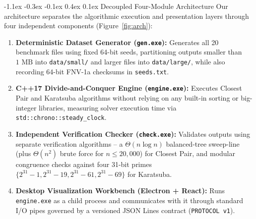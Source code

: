\documentclass[10pt,twocolumn]{article}
\makeatletter
\renewcommand\subsection{\@startsection{subsection}{2}{\z@}%
  {-1.1ex \@plus -0.3ex \@minus -0.1ex}%
  {0.4ex \@plus 0.1ex}%
  {\normalfont\small\bfseries}}
\makeatother
\begin{document}
\subsection{Decoupled Four-Module Architecture}
Our architecture separates the algorithmic execution and presentation layers through four independent components (Figure~\ref{fig:arch}):
\begin{enumerate}
    \item \textbf{Deterministic Dataset Generator (\texttt{gen.exe}):} Generates all 20 benchmark files using fixed 64-bit seeds, partitioning outputs smaller than $1\text{ MB}$ into \texttt{data/small/} and larger files into \texttt{data/large/}, while also recording 64-bit FNV-1a checksums in \texttt{seeds.txt}.
    \item \textbf{C++17 Divide-and-Conquer Engine (\texttt{engine.exe}):} Executes Closest Pair and Karatsuba algorithms without relying on any built-in sorting or big-integer libraries, measuring solver execution time via \texttt{std::chrono::steady\_clock}.
    \item \textbf{Independent Verification Checker (\texttt{check.exe}):} Validates outputs using separate verification algorithms -- a $\Theta(n \log n)$ balanced-tree sweep-line (plus $\Theta(n^2)$ brute force for $n \le 20{,}000$) for Closest Pair, and modular congruence checks against four 31-bit primes $\{2^{31}-1, 2^{31}-19, 2^{31}-61, 2^{31}-69\}$ for Karatsuba.
    \item \textbf{Desktop Visualization Workbench (Electron + React):} Runs \texttt{engine.exe} as a child process and communicates with it through standard I/O pipes governed by a versioned JSON Lines contract (\texttt{PROTOCOL v1}).
\end{enumerate}
\end{document}
